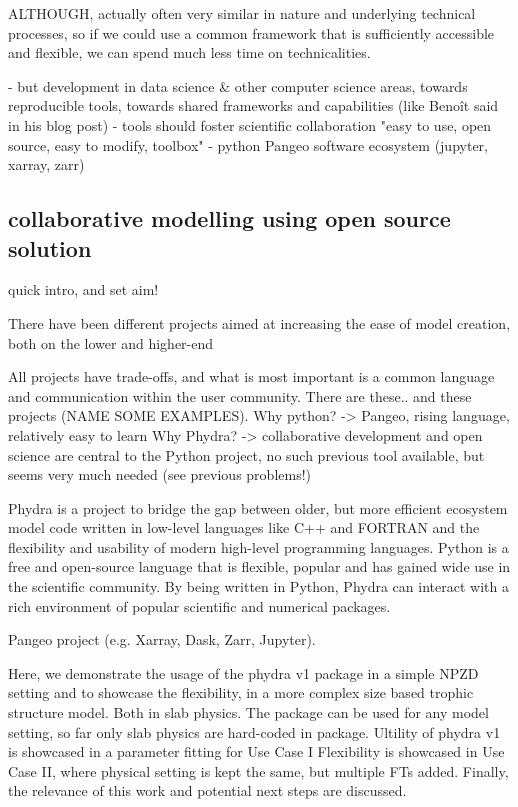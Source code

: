 \documentclass[template.tex]{subfiles}
\begin{document}
ALTHOUGH, actually often very similar in nature and underlying technical processes, so if we could use a common framework that is sufficiently accessible and flexible, we can spend much less time on technicalities.

- but development in data science & other computer science areas, towards reproducible tools, towards shared frameworks and capabilities (like Benoît said in his blog post)
- tools should foster scientific collaboration
"easy to use, open source, easy to modify, toolbox"
- python Pangeo software ecosystem (jupyter, xarray, zarr)

\subsection{collaborative modelling using open source solution}


quick intro, and set aim!

There have been different projects aimed at increasing the ease of model creation, both on the lower and higher-end

All projects have trade-offs, and what is most important is a common language and communication within the user community.
There are these.. and these projects (NAME SOME EXAMPLES).
Why python? -> Pangeo, rising language, relatively easy to learn
Why Phydra? -> collaborative development and open science are central to the Python project, no such previous tool available, but seems very much needed (see previous problems!)

Phydra is a project to bridge the gap between older, but more efficient ecosystem model code written in low-level languages like C++ and FORTRAN and the flexibility and usability of modern high-level programming languages. Python is a free and open-source language that is flexible, popular and has gained wide use in the scientific community. By being written in Python, Phydra can interact with a rich environment of popular scientific and numerical packages. 

Pangeo project (e.g. Xarray, Dask, Zarr, Jupyter). 

Here, we demonstrate the usage of the phydra v1 package in a simple NPZD setting and to showcase the flexibility, in a more complex size based trophic structure model. Both in slab physics.
The package can be used for any model setting, so far only slab physics are hard-coded in package.
Ultility of phydra v1 is showcased in a parameter fitting for Use Case I
Flexibility is showcased in Use Case II, where physical setting is kept the same, but multiple FTs added.
Finally, the relevance of this work and potential next steps are discussed.
\end{document}
